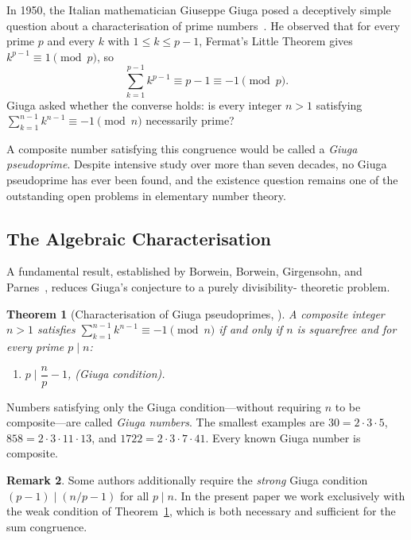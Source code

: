 \documentclass[12pt,a4paper]{amsart}
\newtheorem{theorem}{Theorem}[section]
\theoremstyle{definition}
\newtheorem{remark}[theorem]{Remark}
\begin{document}
In 1950, the Italian mathematician Giuseppe Giuga posed a deceptively simple
question about a characterisation of prime numbers~\cite{Giuga1950}.
He observed that for every prime $p$ and every $k$ with $1 \le k \le p-1$,
Fermat's Little Theorem gives $k^{p-1} \equiv 1 \pmod{p}$, so
\[
  \sum_{k=1}^{p-1} k^{p-1} \equiv p - 1 \equiv -1 \pmod{p}.
\]
Giuga asked whether the converse holds: is every integer $n > 1$ satisfying
$\sum_{k=1}^{n-1} k^{n-1} \equiv -1 \pmod{n}$ necessarily prime?

A composite number satisfying this congruence would be called a
\emph{Giuga pseudoprime}.  Despite intensive study over more than seven
decades, no Giuga pseudoprime has ever been found, and the existence question
remains one of the outstanding open problems in elementary number theory.

\subsection{The Algebraic Characterisation}

A fundamental result, established by Borwein, Borwein, Girgensohn, and
Parnes~\cite{Borwein1996}, reduces Giuga's conjecture to a purely divisibility-
theoretic problem.

\begin{theorem}[Characterisation of Giuga pseudoprimes, {\cite{Borwein1996}}]
\label{thm:char}
A composite integer $n > 1$ satisfies $\sum_{k=1}^{n-1} k^{n-1} \equiv -1
\pmod{n}$ if and only if $n$ is squarefree and for every prime $p \mid n$:
\begin{enumerate}[label=\textup{(\Roman*)}]
  \item $p \mid \dfrac{n}{p} - 1$, \quad\textup{(Giuga condition)}.
\end{enumerate}
\end{theorem}

Numbers satisfying only the Giuga condition---without requiring $n$ to be
composite---are called \emph{Giuga numbers}.  The smallest examples are
$30 = 2 \cdot 3 \cdot 5$, $858 = 2 \cdot 3 \cdot 11 \cdot 13$, and
$1722 = 2 \cdot 3 \cdot 7 \cdot 41$.  Every known Giuga number is composite.

\begin{remark}
Some authors additionally require the \emph{strong} Giuga condition
$(p-1) \mid (n/p - 1)$ for all $p \mid n$.  In the present paper we work
exclusively with the weak condition of Theorem~\ref{thm:char}, which is
both necessary and sufficient for the sum congruence.
\end{remark}
\end{document}
